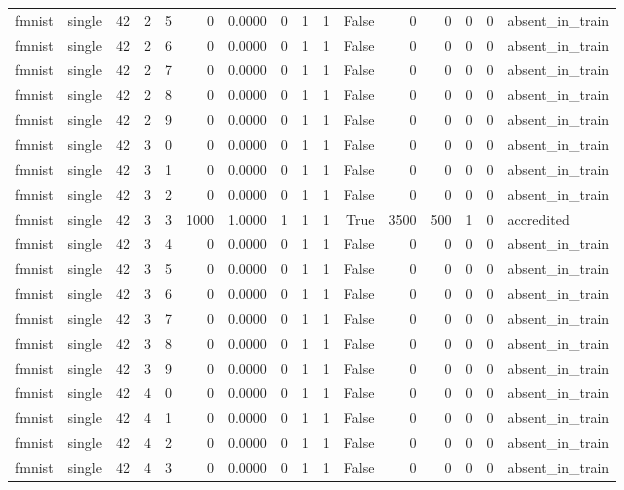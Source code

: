 \begin{tabular}{llrrrrrrrrrrrrrl}
fmnist & single & 42 & 2 & 5 & 0 & 0.0000 & 0 & 1 & 1 & False & 0 & 0 & 0 & 0 & absent\_in\_train \\
fmnist & single & 42 & 2 & 6 & 0 & 0.0000 & 0 & 1 & 1 & False & 0 & 0 & 0 & 0 & absent\_in\_train \\
fmnist & single & 42 & 2 & 7 & 0 & 0.0000 & 0 & 1 & 1 & False & 0 & 0 & 0 & 0 & absent\_in\_train \\
fmnist & single & 42 & 2 & 8 & 0 & 0.0000 & 0 & 1 & 1 & False & 0 & 0 & 0 & 0 & absent\_in\_train \\
fmnist & single & 42 & 2 & 9 & 0 & 0.0000 & 0 & 1 & 1 & False & 0 & 0 & 0 & 0 & absent\_in\_train \\
fmnist & single & 42 & 3 & 0 & 0 & 0.0000 & 0 & 1 & 1 & False & 0 & 0 & 0 & 0 & absent\_in\_train \\
fmnist & single & 42 & 3 & 1 & 0 & 0.0000 & 0 & 1 & 1 & False & 0 & 0 & 0 & 0 & absent\_in\_train \\
fmnist & single & 42 & 3 & 2 & 0 & 0.0000 & 0 & 1 & 1 & False & 0 & 0 & 0 & 0 & absent\_in\_train \\
fmnist & single & 42 & 3 & 3 & 1000 & 1.0000 & 1 & 1 & 1 & True & 3500 & 500 & 1 & 0 & accredited \\
fmnist & single & 42 & 3 & 4 & 0 & 0.0000 & 0 & 1 & 1 & False & 0 & 0 & 0 & 0 & absent\_in\_train \\
fmnist & single & 42 & 3 & 5 & 0 & 0.0000 & 0 & 1 & 1 & False & 0 & 0 & 0 & 0 & absent\_in\_train \\
fmnist & single & 42 & 3 & 6 & 0 & 0.0000 & 0 & 1 & 1 & False & 0 & 0 & 0 & 0 & absent\_in\_train \\
fmnist & single & 42 & 3 & 7 & 0 & 0.0000 & 0 & 1 & 1 & False & 0 & 0 & 0 & 0 & absent\_in\_train \\
fmnist & single & 42 & 3 & 8 & 0 & 0.0000 & 0 & 1 & 1 & False & 0 & 0 & 0 & 0 & absent\_in\_train \\
fmnist & single & 42 & 3 & 9 & 0 & 0.0000 & 0 & 1 & 1 & False & 0 & 0 & 0 & 0 & absent\_in\_train \\
fmnist & single & 42 & 4 & 0 & 0 & 0.0000 & 0 & 1 & 1 & False & 0 & 0 & 0 & 0 & absent\_in\_train \\
fmnist & single & 42 & 4 & 1 & 0 & 0.0000 & 0 & 1 & 1 & False & 0 & 0 & 0 & 0 & absent\_in\_train \\
fmnist & single & 42 & 4 & 2 & 0 & 0.0000 & 0 & 1 & 1 & False & 0 & 0 & 0 & 0 & absent\_in\_train \\
fmnist & single & 42 & 4 & 3 & 0 & 0.0000 & 0 & 1 & 1 & False & 0 & 0 & 0 & 0 & absent\_in\_train \\

\end{tabular}

